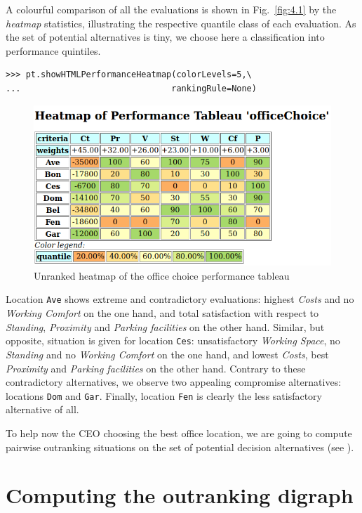 A colourful comparison of all the evaluations is shown in Fig.~\vref{fig:4.1} by the \emph{heatmap} statistics, illustrating the respective quantile class of each evaluation. As the set of potential alternatives is tiny, we choose here a classification into performance quintiles.
\begin{lstlisting}
>>> pt.showHTMLPerformanceHeatmap(colorLevels=5,\
...                              rankingRule=None)
\end{lstlisting}
    \begin{figure}[ht]
\includegraphics[width=0.8\hsize]{Figures/4-1-officeChoiceHeatmap.png}
\caption{Unranked heatmap of the office choice performance tableau}
\label{fig:4.1}       %
\end{figure}

Location \texttt{Ave} shows extreme and contradictory evaluations: highest \emph{Costs} and no \emph{Working Comfort} on the one hand, and total satisfaction with respect to \emph{Standing}, \emph{Proximity} and \emph{Parking facilities} on the other hand. Similar, but opposite, situation is given for location \texttt{Ces}: unsatisfactory \emph{Working Space}, no \emph{Standing} and no \emph{Working Comfort} on the one hand, and lowest \emph{Costs}, best \emph{Proximity} and \emph{Parking facilities} on the other hand. Contrary to these contradictory alternatives, we observe two appealing compromise alternatives: locations \texttt{Dom} and \texttt{Gar}. Finally, location \texttt{Fen} is clearly the less satisfactory alternative of all.

To help now the CEO choosing the best office location, we are going to compute pairwise outranking situations on the set of potential decision alternatives (see \citealp{BIS-2013}).

\section{Computing the outranking digraph}
\label{sec:4.3}

